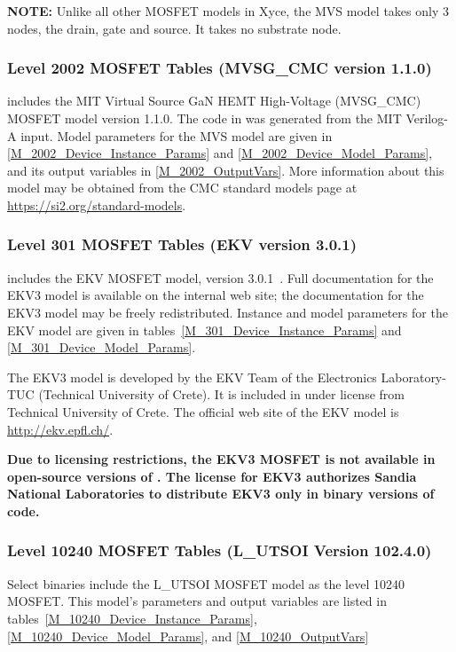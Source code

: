{\bf NOTE: } Unlike all other MOSFET models in Xyce, the MVS model
takes only 3 nodes, the drain, gate and source.  It takes no substrate
node.




\clearpage

\subsubsection{Level 2002 MOSFET Tables (MVSG\_CMC version 1.1.0)}
\Xyce{} includes the MIT Virtual Source GaN HEMT High-Voltage
(MVSG\_CMC) MOSFET model version 1.1.0.  The code in \Xyce{} was
generated from the MIT Verilog-A input.  Model parameters for the MVS
model are given in \ref{M_2002_Device_Instance_Params} and
\ref{M_2002_Device_Model_Params}, and its output variables in
\ref{M_2002_OutputVars}.  More information about this model may be
obtained from the CMC standard models page at
\url{https://si2.org/standard-models}.






\clearpage
\subsubsection{Level 301 MOSFET Tables (EKV version 3.0.1)}
\Xyce{} includes the EKV MOSFET model, version
3.0.1~\cite{BLETK:1997}\cite{EKV:2006}\cite{EKV:2007}.  Full
documentation for the EKV3 model is available on the \Xyce{} internal web site;
the documentation for the EKV3 model may be freely redistributed.  Instance and
model parameters for the EKV model are given in
tables~\ref{M_301_Device_Instance_Params} and \ref{M_301_Device_Model_Params}.

The EKV3 model is developed by the EKV Team of the Electronics Laboratory-TUC
(Technical University of Crete). It is included in \Xyce{} under license from
Technical University of Crete.  The official web site of the EKV model is
\url{http://ekv.epfl.ch/}.

\textbf{Due to licensing restrictions, the EKV3 MOSFET is not available in
     open-source versions of \Xyce{}.  The license for EKV3 authorizes Sandia
     National Laboratories to distribute EKV3 only in binary versions of code.}





\clearpage
\subsubsection{Level 10240 MOSFET Tables (L\_UTSOI Version 102.4.0)}
Select \Xyce{} binaries include the L\_UTSOI MOSFET model as the level
10240 MOSFET.  This model's parameters and output variables are listed in tables~\ref{M_10240_Device_Instance_Params}, \ref{M_10240_Device_Model_Params}, and \ref{M_10240_OutputVars}

